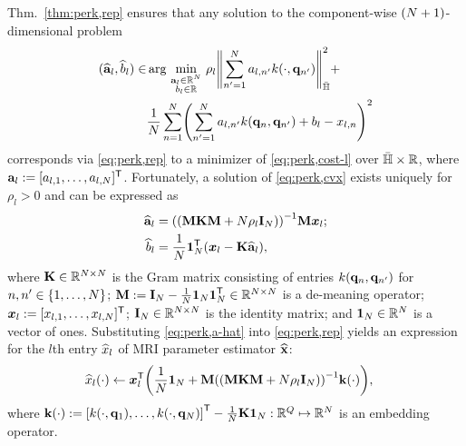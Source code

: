 Thm.~\ref{thm:perk,rep} ensures 
that any solution
to the component-wise 
$\paren{N+1}$-dimensional problem
\begin{align}
	(\est{\bma}_l,\est{b}_l) \in 
	&\argmin{\substack{\bma_l \in \reals{N} \\ b_l \in \real}} 
	\rho_l \norm{\sum_{n'=1}^N a_{l,n'} k(\cdot,\bmq_{n'})}^2_\rkhs + \nonumber \\
	&\frac{1}{N} \sum_{n=1}^N \paren{\sum_{n'=1}^N a_{l,n'} k(\bmq_n,\bmq_{n'}) + b_l - x_{l,n}}^2
	\label{eq:perk,cvx}
\end{align}
corresponds via \eqref{eq:perk,rep} 
to a minimizer of \eqref{eq:perk,cost-l}
over ${\bar{\mathbb{H}}} \times \mathbb{R}$,
where $\mathbf{a}_l := [a_{l,1},\dots,a_{l,N}]^{\mathsf{T}}$.
Fortunately, a solution of \eqref{eq:perk,cvx} exists uniquely
for $\rho_l > 0$
and can be expressed as
\begin{align}
	\est{\bma}_l &= \inv{\paren{\bmM \bmK \bmM + N\rho_l\eye{N}}} \bmM \bmxtl{l};
	\label{eq:perk,a-hat} \\
	\est{b}_l &= \frac{1}{N} \ones{N}\tpose \paren{\bmxtl{l} - \bmK \est{\bma}_l},
	\label{eq:perk,b-hat}
\end{align}
where 
$\mathbf{K} \in \mathbb{R}^{N \times N}$ is the Gram matrix 
consisting of entries $k(\mathbf{q}_n,\mathbf{q}_{n'})$ for $n,n' \in \set{1,\dots,N}$;
$\mathbf{M} := \mathbf{I}_{N}-\frac{1}{N}\boldsymbol{1}_{N}\boldsymbol{1}_{N}^{\mathsf{T}} \in \mathbb{R}^{N \times N}$
is a de-meaning operator;
$\boldsymbol{x}_{l} := [x_{l,1},\dots,x_{l,N}]^{\mathsf{T}}$;
$\mathbf{I}_{N} \in \mathbb{R}^{N \times N}$ is the identity matrix;
and $\boldsymbol{1}_{N} \in \mathbb{R}^{N}$ is a vector of ones.
Substituting \eqref{eq:perk,a-hat} into \eqref{eq:perk,rep} 
yields an expression 
for the $l$th entry $\widehat{x}_l$ 
of MRI parameter estimator $\widehat{\mathbf{x}}$:
\begin{align}
	\est{x}_l\paren{\cdot} &\gets \bmxtl{l}\tpose 
		\paren{\frac{1}{N}\ones{N} + 
		\bmM\inv{\paren{\bmM\bmK\bmM + N\rho_l\eye{N}}} \bmka{\cdot}},
		\label{eq:perk,xl-hat}
\end{align}
where
$\bmka{\cdot} := 
	\brac{k(\cdot,\bmq_1),\dots,k(\cdot,\bmq_N)}\tpose - \frac{1}{N}\bmK\ones{N}
	: \reals{Q} \mapsto \reals{N}$
is an embedding operator.

